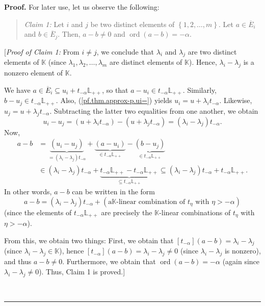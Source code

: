 \documentclass[numbers=enddot,12pt,final,onecolumn,notitlepage]{scrartcl}%
\theoremstyle{definition}
\newenvironment{statement}{\begin{quote}}{\end{quote}}
\newenvironment{proof}[1][Proof]{\noindent\textbf{#1.} }{\ \rule{0.5em}{0.5em}}
\theoremstyle{plainsl}
\begin{document}
\begin{proof}
For later use, let us observe the following:

\begin{statement}
\textit{Claim 1:} Let $i$ and $j$ be two distinct elements of $\left\{
1,2,\ldots,m\right\}  $. Let $a\in\overline{E}_{i}$ and $b\in\overline{E}_{j}%
$. Then, $a-b\neq0$ and $\operatorname*{ord}\left(  a-b\right)  =-\alpha$.
\end{statement}

[\textit{Proof of Claim 1:} From $i\neq j$, we conclude that $\lambda_{i}$ and
$\lambda_{j}$ are two distinct elements of $\mathbb{K}$ (since $\lambda
_{1},\lambda_{2},\ldots,\lambda_{m}$ are distinct elements of $\mathbb{K}$).
Hence, $\lambda_{i}-\lambda_{j}$ is a nonzero element of $\mathbb{K}$.

We have $a\in\overline{E}_{i}\subseteq u_{i}+t_{-\alpha}\mathbb{L}_{++}$, so
that $a-u_{i}\in t_{-\alpha}\mathbb{L}_{++}$. Similarly, $b-u_{j}\in
t_{-\alpha}\mathbb{L}_{++}$. Also, (\ref{pf.thm.approx-p.ui=}) yields
$u_{i}=u+\lambda_{i}t_{-\alpha}$. Likewise, $u_{j}=u+\lambda_{j}t_{-\alpha}$.
Subtracting the latter two equalities from one another, we obtain%
\[
u_{i}-u_{j}=\left(  u+\lambda_{i}t_{-\alpha}\right)  -\left(  u+\lambda
_{j}t_{-\alpha}\right)  =\left(  \lambda_{i}-\lambda_{j}\right)  t_{-\alpha}.
\]
Now,%
\begin{align*}
a-b  &  =\underbrace{\left(  u_{i}-u_{j}\right)  }_{=\left(  \lambda
_{i}-\lambda_{j}\right)  t_{-\alpha}}+\underbrace{\left(  a-u_{i}\right)
}_{\in t_{-\alpha}\mathbb{L}_{++}}-\underbrace{\left(  b-u_{j}\right)  }_{\in
t_{-\alpha}\mathbb{L}_{++}}\\
&  \in\left(  \lambda_{i}-\lambda_{j}\right)  t_{-\alpha}%
+\underbrace{t_{-\alpha}\mathbb{L}_{++}-t_{-\alpha}\mathbb{L}_{++}}_{\subseteq
t_{-\alpha}\mathbb{L}_{++}}\subseteq\left(  \lambda_{i}-\lambda_{j}\right)
t_{-\alpha}+t_{-\alpha}\mathbb{L}_{++}.
\end{align*}
In other words, $a-b$ can be written in the form
\[
a-b=\left(  \lambda_{i}-\lambda_{j}\right)  t_{-\alpha}+\left(  \text{a
}\mathbb{K}\text{-linear combination of }t_{\eta}\text{ with }\eta
>-\alpha\right)
\]
(since the elements of $t_{-\alpha}\mathbb{L}_{++}$ are precisely the
$\mathbb{K}$-linear combinations of $t_{\eta}$ with $\eta>-\alpha$).

From this, we obtain two things: First, we obtain that $\left[  t_{-\alpha
}\right]  \left(  a-b\right)  =\lambda_{i}-\lambda_{j}$ (since $\lambda
_{i}-\lambda_{j}\in\mathbb{K}$), hence $\left[  t_{-\alpha}\right]  \left(
a-b\right)  =\lambda_{i}-\lambda_{j}\neq0$ (since $\lambda_{i}-\lambda_{j}$ is
nonzero), and thus $a-b\neq0$. Furthermore, we obtain that
$\operatorname*{ord}\left(  a-b\right)  =-\alpha$ (again since $\lambda
_{i}-\lambda_{j}\neq0$). Thus, Claim 1 is proved.] \medskip


\end{proof}
\end{document}
